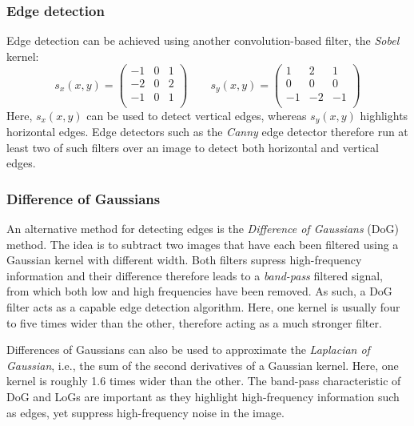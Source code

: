 \subsubsection{Edge detection}\label{sec:sobel}

Edge detection can be achieved using another convolution-based filter, the \textsl{Sobel} kernel:
\begin{equation}
s_x(x,y)=
\left(
\begin{array}{ccc}
-1 & 0 & 1\\
-2 & 0 & 2\\
-1 & 0 & 1\\
\end{array}
\right)
\qquad
s_y(x,y)=
\left(
\begin{array}{ccc}
1 & 2 & 1\\
0 & 0 & 0\\
-1 & -2 & -1\\
\end{array}
\right)
\end{equation}
Here, $s_x(x,y)$ can be used to detect vertical edges, whereas $s_y(x,y)$ highlights horizontal edges. Edge detectors such as the \textsl{Canny} edge detector therefore run at least two of such filters over an image to detect both horizontal and vertical edges.

\subsubsection{Difference of Gaussians}

An alternative method for detecting edges is the \textsl{Difference of Gaussians} (DoG) method. The idea is to subtract two images that have each been filtered using a Gaussian kernel with different width. Both filters supress high-frequency information and their difference therefore leads to a \textsl{band-pass} filtered signal, from which both low and high frequencies have been removed. As such, a DoG filter acts as a capable edge detection algorithm. Here, one kernel is usually four to five times wider than the other, therefore acting as a much stronger filter.

Differences of Gaussians can also be used to approximate the \textsl{Laplacian of Gaussian}, i.e., the sum of the second derivatives of a Gaussian kernel. Here, one kernel is roughly 1.6 times wider than the other. The band-pass characteristic of DoG and LoGs are important as they highlight high-frequency information such as edges, yet suppress high-frequency noise in the image.

